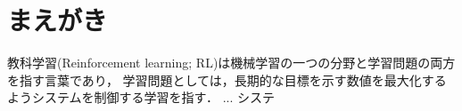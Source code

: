 \section{まえがき}
教科学習(Reinforcement learning; RL)は機械学習の一つの分野と学習問題の両方を指す言葉であり，
学習問題としては，長期的な目標を示す数値を最大化するようシステムを制御する学習を指す．
...
システ
